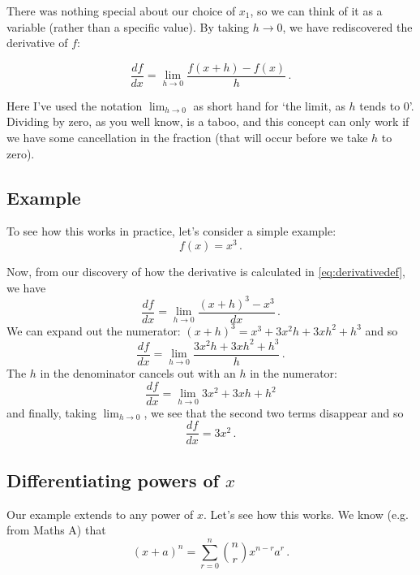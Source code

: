 \documentclass[12pt]{article}
\begin{document}
There was nothing special about our choice of $x_1$, so we can think of it as a variable (rather than a specific value).
By taking $h\to 0$, we have rediscovered the derivative of $f$:

\begin{equation}\label{eq:derivativedef}
\frac{df}{dx} = \lim_{h\to 0} \frac{f(x+h) - f(x)}{h}\,.    
\end{equation} 

Here I've used the notation $\lim_{h\to 0}$ as short hand for `the limit, as $h$ tends to 0'. Dividing by zero, as you well know, is a taboo, and this concept can only work if we have some cancellation in the fraction (that will occur before we take $h$ to zero).

\subsection*{Example}
To see how this works in practice, let's consider a simple example:
\begin{equation}
  f(x)=x^3\,.
\end{equation}

Now, from our discovery of how the derivative is calculated in \eqref{eq:derivativedef}, we have
\begin{equation}
  \frac{df}{dx}=\lim_{h\to 0}\frac{(x+h)^3-x^3}{dx}\,.
\end{equation}
We can expand out the numerator: $(x+h)^3 = x^3 + 3x^2h + 3xh^2 + h^3$
and so
\begin{equation}
  \frac{df}{dx}=\lim_{h\to 0}\frac{3x^2h + 3xh^2 + h^3}{h}\,.
\end{equation}
The $h$ in the denominator cancels out with an $h$ in the numerator:
\begin{equation}
  \frac{df}{dx}=\lim_{h\to 0} 3x^2 + 3xh + h^2
\end{equation}
and finally, taking $\lim_{h\to 0}$, we see that the second two terms disappear and so
\begin{equation}
  \frac{df}{dx}=3x^2\,.
\end{equation}

\subsection*{Differentiating powers of $x$}
Our example extends to any power of $x$. Let's see how this works. We know (e.g. from Maths A) that
\begin{equation}
  (x+a)^n = \sum_{r=0}^n \binom{n}{r}x^{n-r}a^r\,.
\end{equation}
\end{document}
